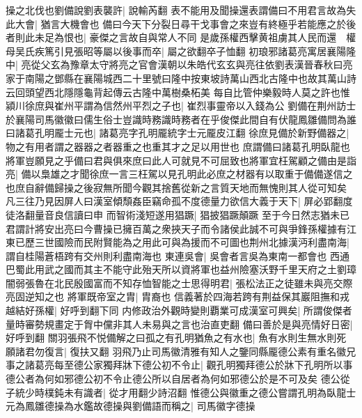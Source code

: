 操之北伐也劉備說劉表襲許|{
	說輸芮翻}
表不能用及聞操還表謂備曰不用君言故為失此大會|{
	猶言大機會也}
備曰今天下分裂日尋干戈事會之來豈有終極乎若能應之於後者則此未足為恨也|{
	豪傑之言故自與常人不同}
是歲孫權西擊黄祖虜其人民而還　權母吴氏疾篤引見張昭等屬以後事而卒|{
	屬之欲翻卒子恤翻}
初琅邪諸葛亮寓居襄陽隆中|{
	亮從父玄為豫章太守將亮之官會漢朝以朱皓代玄玄與亮往依劉表漢晉春秋曰亮家于南陽之鄧縣在襄陽城西二十里號曰隆中按東坡詩萬山西北古隆中也故其萬山詩云回頭望西北隱隱龜背起傳云古隆中萬樹桑柘美}
每自比管仲樂毅時人莫之許也惟潁川徐庶與崔州平謂為信然州平烈之子也|{
	崔烈事靈帝以入錢為公}
劉備在荆州訪士於襄陽司馬徽徽曰儒生俗士豈識時務識時務者在乎俊傑此間自有伏龍鳳雛備問為誰曰諸葛孔明龎士元也|{
	諸葛亮字孔明龎統字士元龎皮江翻}
徐庶見備於新野備器之|{
	物之有用者謂之器器之者器重之也重其才之足以用世也}
庶謂備曰諸葛孔明臥龍也將軍豈願見之乎備曰君與俱來庶曰此人可就見不可屈致也將軍宜枉駕顧之備由是詣亮|{
	備以梟雄之才聞徐庶一言三枉駕以見孔明此必庶之材器有以取重于備備遂信之也庶自辭備歸操之後寂無所聞今觀其捨舊從新之言質天地而無愧則其人從可知矣}
凡三往乃見因屏人曰漢室傾頹姦臣竊命孤不度德量力欲信大義于天下|{
	屏必郢翻度徒洛翻量音良信讀曰申}
而智術淺短遂用猖蹶|{
	猖披猖蹶顛蹶}
至于今日然志猶未已君謂計將安出亮曰今曹操已擁百萬之衆挾天子而令諸侯此誠不可與爭鋒孫權據有江東已歷三世國險而民附賢能為之用此可與為援而不可圖也荆州北據漢沔利盡南海|{
	謂自桂陽蒼梧跨有交州則利盡南海也}
東連吳會|{
	吳會者言吳為東南一都會也}
西通巴蜀此用武之國而其主不能守此殆天所以資將軍也益州險塞沃野千里天府之土劉璋闇弱張魯在北民殷國富而不知存恤智能之士思得明君|{
	張松法正之徒雖未與亮交際亮固逆知之也}
將軍既帝室之胄|{
	胄裔也}
信義著於四海若跨有荆益保其巖阻撫和戎越結好孫權|{
	好呼到翻下同}
内修政治外觀時變則覇業可成漢室可興矣|{
	所謂俊傑者量時審勢規畫定于胷中儻非其人未易與之言也治直吏翻}
備曰善於是與亮情好日密|{
	好呼到翻}
關羽張飛不悦備解之曰孤之有孔明猶魚之有水也|{
	魚有水則生無水則死}
願諸君勿復言|{
	復扶又翻}
羽飛乃止司馬徽清雅有知人之鑒同縣龎德公素有重名徽兄事之諸葛亮每至德公家獨拜牀下德公初不令止|{
	觀孔明獨拜德公於牀下孔明所以事德公者為何如邪德公初不令止德公所以自居者為何如邪德公於是不可及矣}
德公從子統少時樸鈍未有識者|{
	從才用翻少詩沼翻}
惟德公與徽重之德公嘗謂孔明為臥龍士元為鳳雛德操為水鑑故德操與劉備語而稱之|{
	司馬徽字德操}


